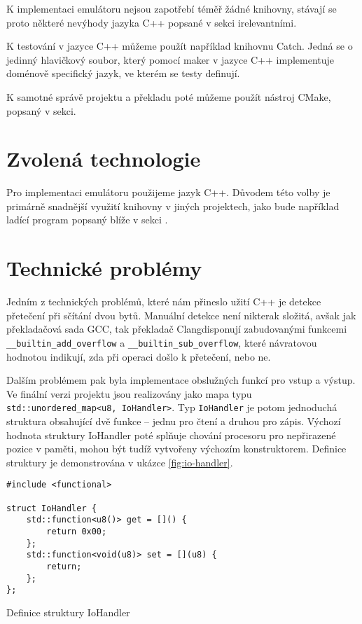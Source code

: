 K implementaci emulátoru nejsou zapotřebí téměř žádné knihovny, stávají se proto některé nevýhody jazyka C++ popsané v sekci  irelevantními.

K testování v jazyce C++ můžeme použít například knihovnu Catch\todocite. Jedná se o jedinný hlavičkový soubor, který pomocí maker v jazyce C++ implementuje doménově specifický jazyk, ve kterém se testy definují.

K samotné správě projektu a překladu poté můžeme použít nástroj CMake, popsaný v sekci.

\section{Zvolená technologie}

Pro implementaci emulátoru použijeme jazyk C++. Důvodem této volby je primárně snadnější využití knihovny v jiných projektech, jako bude například ladící program popsaný blíže v sekci .

\section{Technické problémy}

Jedním z technických problémů, které nám přineslo užití C++ je detekce přetečení při sčítání dvou bytů. Manuální detekce není nikterak složitá, avšak jak překladačová sada GCC\todocite, tak překladač Clang\todocite disponují zabudovanými funkcemi \texttt{\_\_builtin\_add\_overflow} a \texttt{\_\_builtin\_sub\_overflow}, které návratovou hodnotou indikují, zda při operaci došlo k přetečení, nebo ne.

Dalším problémem pak byla implementace obslužných funkcí pro vstup a výstup. Ve finální verzi projektu jsou realizovány jako mapa typu \texttt{std::unordered_map<u8, IoHandler>}. Typ \texttt{IoHandler} je potom jednoduchá struktura obsahující dvě funkce -- jednu pro čtení a druhou pro zápis. Výchozí hodnota struktury IoHandler poté splňuje chování procesoru pro nepřirazené pozice v paměti, mohou být tudíž vytvořeny výchozím konstruktorem. Definice struktury je demonstrována v ukázce \ref{fig:io-handler}.

\begin{listing}
\begin{verbatim}
#include <functional>

struct IoHandler {
    std::function<u8()> get = []() {
        return 0x00;
    };
    std::function<void(u8)> set = [](u8) {
        return;
    };
};
\end{verbatim}
\caption{Definice struktury IoHandler}
\label{fig:io-handler}
\end{listing}


